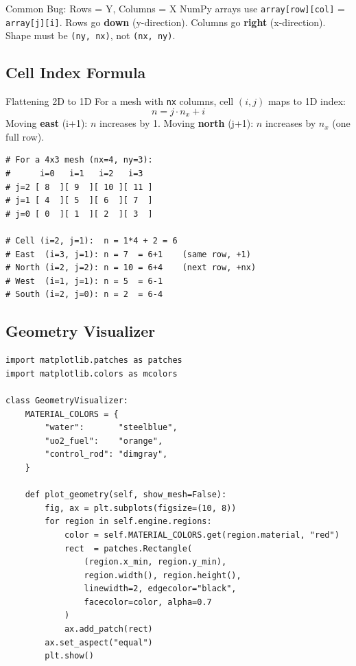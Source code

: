 \documentclass[12pt,a4paper]{article}
\begin{document}
\begin{warnbox}{Common Bug: Rows = Y, Columns = X}
NumPy arrays use \texttt{array[row][col]} = \texttt{array[j][i]}.
Rows go \textbf{down} (y-direction). Columns go \textbf{right} (x-direction).
Shape must be \texttt{(ny, nx)}, not \texttt{(nx, ny)}.
\end{warnbox}

\subsection{Cell Index Formula}

\begin{physicsbox}{Flattening 2D to 1D}
For a mesh with \texttt{nx} columns, cell $(i,j)$ maps to 1D index:
\begin{equation}
n = j \cdot n_x + i
\end{equation}
Moving \textbf{east} (i+1): $n$ increases by 1.
Moving \textbf{north} (j+1): $n$ increases by $n_x$ (one full row).
\end{physicsbox}

\begin{lstlisting}[caption={Cell Index -- Student Exercise that Built Understanding}]
# For a 4x3 mesh (nx=4, ny=3):
#      i=0   i=1   i=2   i=3
# j=2 [ 8  ][ 9  ][ 10 ][ 11 ]
# j=1 [ 4  ][ 5  ][ 6  ][ 7  ]
# j=0 [ 0  ][ 1  ][ 2  ][ 3  ]

# Cell (i=2, j=1):  n = 1*4 + 2 = 6
# East  (i=3, j=1): n = 7  = 6+1    (same row, +1)
# North (i=2, j=2): n = 10 = 6+4    (next row, +nx)
# West  (i=1, j=1): n = 5  = 6-1
# South (i=2, j=0): n = 2  = 6-4
\end{lstlisting}

\subsection{Geometry Visualizer}

\begin{lstlisting}[caption={Drawing Reactor Geometry with matplotlib}]
import matplotlib.patches as patches
import matplotlib.colors as mcolors

class GeometryVisualizer:
    MATERIAL_COLORS = {
        "water":       "steelblue",
        "uo2_fuel":    "orange",
        "control_rod": "dimgray",
    }

    def plot_geometry(self, show_mesh=False):
        fig, ax = plt.subplots(figsize=(10, 8))
        for region in self.engine.regions:
            color = self.MATERIAL_COLORS.get(region.material, "red")
            rect  = patches.Rectangle(
                (region.x_min, region.y_min),
                region.width(), region.height(),
                linewidth=2, edgecolor="black",
                facecolor=color, alpha=0.7
            )
            ax.add_patch(rect)
        ax.set_aspect("equal")
        plt.show()
\end{lstlisting}
\end{document}
